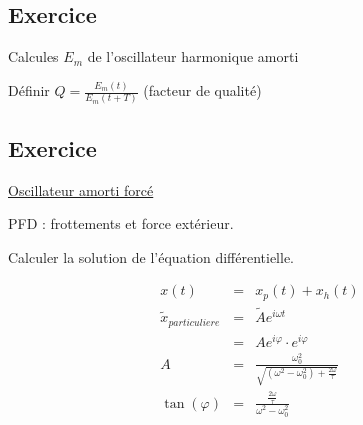 	\subsection{Exercice}
	Calcules $E_m$ de l'oscillateur harmonique amorti

	Définir $Q = \frac{E_m(t)}{E_m(t+T)}$ (facteur de qualité)

	\subsection{Exercice}
	\ul{Oscillateur amorti forcé}

	PFD : frottements et force extérieur.

	Calculer la solution de l'équation différentielle.

	\[\begin{array}{rcl}
			x(t) &=& x_p(t) + x_h(t) \\
			\tilde{x}_{particuliere} &=& \tilde{A}e^{i\omega t} \\
								   &=& Ae^{i\varphi } \cdot e^{i \varphi}\\
			A &=& \frac{\omega_0^2}{\sqrt{(\omega^2 - \omega_0^2) + \frac{2\omega}{\tau}}} \\
	\tan (\varphi) &=& \frac{\frac{2\omega}{\tau}}{\omega^2 - \omega_0^2} \end{array}\]
